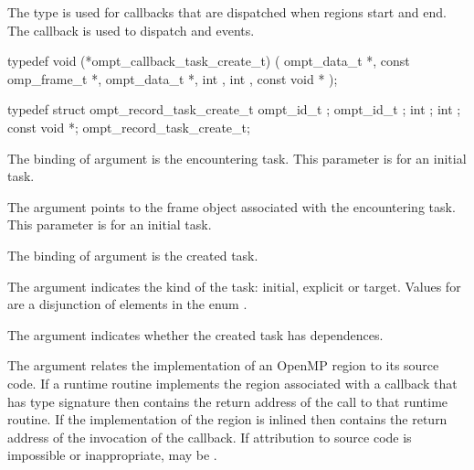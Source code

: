 \label{sec:ompt_callback_task_create_t}

\summary
The  type is used for callbacks that are 
dispatched when  regions start and end.
The  callback is used to dispatch
 and  events.

\format
\begin{ccppspecific}
\begin{omptCallback}
typedef void (*ompt_callback_task_create_t) (
  ompt_data_t *,
  const omp_frame_t *,
  ompt_data_t *,
  int ,
  int ,
  const void *
);
\end{omptCallback}
\end{ccppspecific}


\record
\begin{ccppspecific}
\begin{omptRecord}
typedef struct ompt_record_task_create_t {
  ompt_id_t ;
  ompt_id_t ;
  int ;
  int ;
  const void *;
} ompt_record_task_create_t;
\end{omptRecord}
\end{ccppspecific}


\argdesc

The binding of argument  is the
encountering task.
This parameter is  for an initial task.

The argument  points to the frame object
associated with the encountering task.
This parameter is  for an initial task.

The binding of argument  is the created
task.

The argument  indicates the kind of the task: initial,
explicit or target.
Values for  are a disjunction of elements in the enum
.

The argument  indicates whether the created
task has dependences.

The  argument relates the implementation of an OpenMP region
to its source code. If a runtime routine implements the region associated with
a callback that has type signature  then
 contains the return address of the call to that runtime routine.
If the implementation of the region is inlined then  contains the
return address of the invocation of the callback. If attribution to source code
is impossible or inappropriate, may be .

